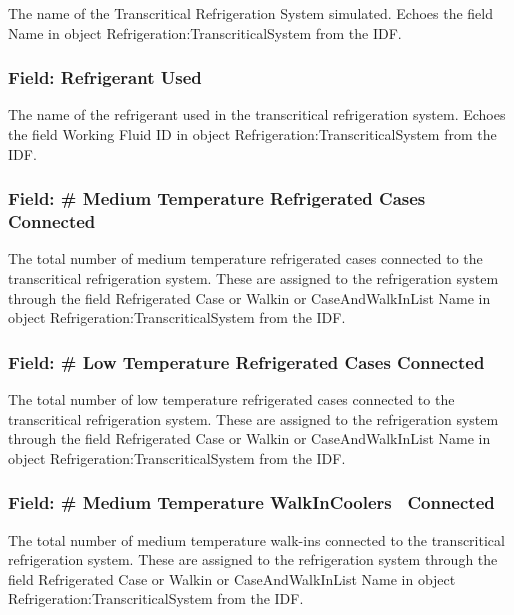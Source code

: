 The name of the Transcritical Refrigeration System simulated. Echoes the field Name in object Refrigeration:TranscriticalSystem from the IDF.

\subsubsection{Field: Refrigerant Used}\label{field-refrigerant-used-1}

The name of the refrigerant used in the transcritical refrigeration system. Echoes the field Working Fluid ID in object Refrigeration:TranscriticalSystem from the IDF.

\subsubsection{Field: \# Medium Temperature Refrigerated Cases Connected}\label{field-medium-temperature-refrigerated-cases-connected}

The total number of medium temperature refrigerated cases connected to the transcritical refrigeration system. These are assigned to the refrigeration system through the field Refrigerated Case or Walkin or CaseAndWalkInList Name in object Refrigeration:TranscriticalSystem from the IDF.

\subsubsection{Field: \# Low Temperature Refrigerated Cases Connected}\label{field-low-temperature-refrigerated-cases-connected}

The total number of low temperature refrigerated cases connected to the transcritical refrigeration system. These are assigned to the refrigeration system through the field Refrigerated Case or Walkin or CaseAndWalkInList Name in object Refrigeration:TranscriticalSystem from the IDF.

\subsubsection{Field: \# Medium Temperature WalkInCoolers~ Connected}\label{field-medium-temperature-walkincoolers-connected}

The total number of medium temperature walk-ins connected to the transcritical refrigeration system. These are assigned to the refrigeration system through the field Refrigerated Case or Walkin or CaseAndWalkInList Name in object Refrigeration:TranscriticalSystem from the IDF.


